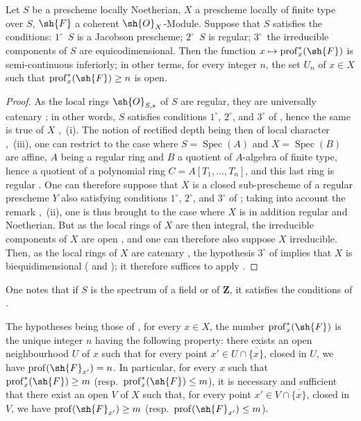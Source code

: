 \begin{proposition}[10.8.5]
\label{IV.10.8.5}
Let $S$ be a prescheme locally Noetherian, $X$ a prescheme locally of finite type over $S$, $\sh{F}$ a coherent $\sh{O}_X$-Module.
Suppose that $S$ satisfies the conditions: $1^\circ$~$S$ is a Jacobson prescheme; $2^\circ$~$S$ is regular; $3^\circ$~the irreducible components of $S$ are equicodimensional.
Then the function $x\mapsto\operatorname{prof}^*_x(\sh{F})$ is semi-continuous inferiorly; in other terms, for every integer $n$, the set $U_n$ of $x\in X$ such that $\operatorname{prof}^*_x(\sh{F})\geq n$ is open.
\end{proposition}

\begin{proof}
As the local rings $\sh{O}_{S,s}$ of $S$ are regular, they are universally catenary ; in other words, $S$ satisfies conditions $1^\circ$, $2^\circ$, and $3^\circ$ of , hence the same is true of $X$ ,~(i).
The notion of rectified depth being then of local character ,~(iii), one can restrict to the case where $S=\operatorname{Spec}(A)$ and $X=\operatorname{Spec}(B)$ are affine, $A$ being a regular ring and $B$ a quotient of $A$-algebra of finite type, hence a quotient of a polynomial ring $C=A[T_1,\ldots,T_n]$, and this last ring is regular .
One can therefore suppose that $X$ is a closed sub-prescheme of a regular prescheme $Y$ also satisfying conditions $1^\circ$, $2^\circ$, and $3^\circ$ of ; taking into account the remark ,~(ii), one is thus brought to the case where $X$ is in addition regular and Noetherian.
But as the local rings of $X$ are then integral, the irreducible components of $X$ are
open , and one can therefore also suppose $X$ irreducible.
Then, as the local rings of $X$ are catenary , the hypothesis $3^\circ$ of  implies that $X$ is biequidimensional ( and ); it therefore suffices to apply .
\end{proof}

One notes that if $S$ is the spectrum of a field or of $\mathbf{Z}$, it satisfies the conditions of .

\begin{corollary}[10.8.6]
\label{IV.10.8.6}
The hypotheses being those of , for every $x\in X$, the number $\operatorname{prof}^*_x(\sh{F})$ is the unique integer $n$ having the following property: there exists an open neighbourhood $U$ of $x$ such that for every point $x'\in U\cap\overline{\{x\}}$, closed in $U$, we have $\operatorname{prof}(\sh{F}_{x'})=n$.
In particular, for every $x$ such that $\operatorname{prof}^*_x(\sh{F})\geq m$ (resp.\ $\operatorname{prof}^*_x(\sh{F})\leq m$), it is necessary and sufficient that there exist an open $V$ of $X$ such that, for every point $x'\in V\cap\overline{\{x\}}$, closed in $V$, we have $\operatorname{prof}(\sh{F}_{x'})\geq m$ (resp.\ $\operatorname{prof}(\sh{F}_{x'})\leq m$).
\end{corollary}

